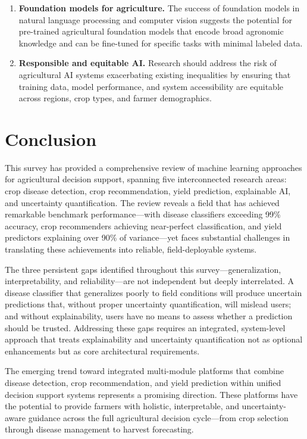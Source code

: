 \documentclass[journal]{IEEEtran}
\begin{document}
\begin{enumerate}[leftmargin=*]
  \item \textbf{Foundation models for agriculture.} The success of foundation models in natural language processing and computer vision suggests the potential for pre-trained agricultural foundation models that encode broad agronomic knowledge and can be fine-tuned for specific tasks with minimal labeled data.
  
  \item \textbf{Responsible and equitable AI.} Research should address the risk of agricultural AI systems exacerbating existing inequalities by ensuring that training data, model performance, and system accessibility are equitable across regions, crop types, and farmer demographics.
\end{enumerate}


\section{Conclusion}
\label{sec:conclusion}

This survey has provided a comprehensive review of machine learning approaches for agricultural decision support, spanning five interconnected research areas: crop disease detection, crop recommendation, yield prediction, explainable AI, and uncertainty quantification. The review reveals a field that has achieved remarkable benchmark performance---with disease classifiers exceeding 99\% accuracy, crop recommenders achieving near-perfect classification, and yield predictors explaining over 90\% of variance---yet faces substantial challenges in translating these achievements into reliable, field-deployable systems.

The three persistent gaps identified throughout this survey---generalization, interpretability, and reliability---are not independent but deeply interrelated. A disease classifier that generalizes poorly to field conditions will produce uncertain predictions that, without proper uncertainty quantification, will mislead users; and without explainability, users have no means to assess whether a prediction should be trusted. Addressing these gaps requires an integrated, system-level approach that treats explainability and uncertainty quantification not as optional enhancements but as core architectural requirements.

The emerging trend toward integrated multi-module platforms that combine disease detection, crop recommendation, and yield prediction within unified decision support systems represents a promising direction. These platforms have the potential to provide farmers with holistic, interpretable, and uncertainty-aware guidance across the full agricultural decision cycle---from crop selection through disease management to harvest forecasting.
\end{document}

